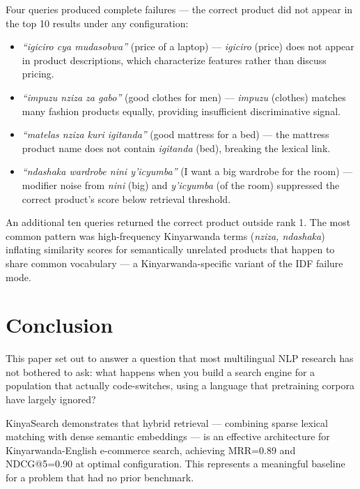 \documentclass[11pt,a4paper]{article}
\begin{document}
Four queries produced complete failures — the correct product did not
appear in the top 10 results under any configuration:

\begin{itemize}[leftmargin=1.5em, itemsep=2pt]
  \item \textit{``igiciro cya mudasobwa''} (price of a laptop) —
        \textit{igiciro} (price) does not appear in product descriptions,
        which characterize features rather than discuss pricing.
  \item \textit{``impuzu nziza za gabo''} (good clothes for men) —
        \textit{impuzu} (clothes) matches many fashion products equally,
        providing insufficient discriminative signal.
  \item \textit{``matelas nziza kuri igitanda''} (good mattress for a bed)
        — the mattress product name does not contain \textit{igitanda}
        (bed), breaking the lexical link.
  \item \textit{``ndashaka wardrobe nini y'icyumba''} (I want a big
        wardrobe for the room) — modifier noise from \textit{nini}
        (big) and \textit{y'icyumba} (of the room) suppressed the
        correct product's score below retrieval threshold.
\end{itemize}

An additional ten queries returned the correct product outside rank 1.
The most common pattern was high-frequency Kinyarwanda terms
(\textit{nziza, ndashaka}) inflating similarity scores for semantically
unrelated products that happen to share common vocabulary — a
Kinyarwanda-specific variant of the IDF failure mode.

\section{Conclusion}
\label{sec:conclusion}

This paper set out to answer a question that most multilingual NLP
research has not bothered to ask: what happens when you build a search
engine for a population that actually code-switches, using a language
that pretraining corpora have largely ignored?

KinyaSearch demonstrates that hybrid retrieval — combining sparse lexical
matching with dense semantic embeddings — is an effective architecture for
Kinyarwanda-English e-commerce search, achieving MRR=0.89 and NDCG@5=0.90
at optimal configuration. This represents a meaningful baseline for a
problem that had no prior benchmark.
\end{document}

